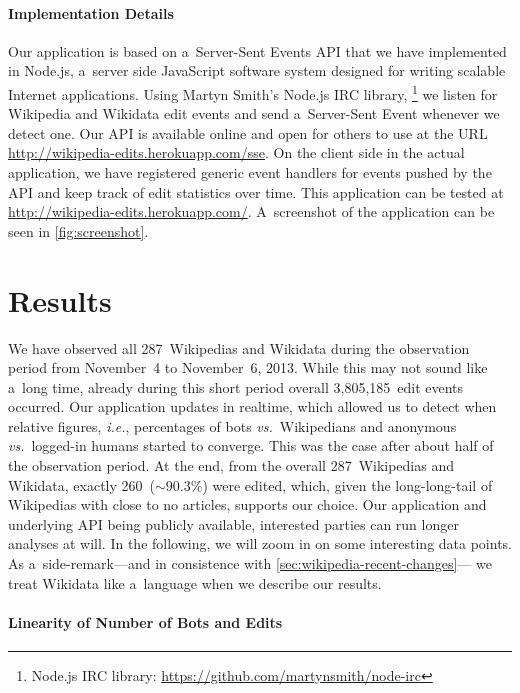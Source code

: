 \documentclass{sig-alternate}
\newcommand{\inlinelistingsize}{\fontsize{8pt}{11pt}}
\let\oldurl\url
\renewcommand{\url}[1]{\inlinelistingsize\oldurl{#1}}
\begin{document}
\paragraph{Implementation Details}

Our application is based on a~Server-Sent Events API
that we have implemented in Node.js,
a~server side JavaScript software system
designed for writing scalable Internet applications.
Using Martyn Smith's Node.js IRC library,%
\footnote{Node.js IRC library:
\url{https://github.com/martynsmith/node-irc}}
we listen for Wikipedia and Wikidata edit events
and send a~Server-Sent Event whenever we detect one.
Our API is available online and open for others to use at the URL
\url{http://wikipedia-edits.herokuapp.com/sse}.
On the client side in the actual application,
we have registered generic event handlers for events
pushed by the API and keep track of edit statistics over time.
This application can be tested at
\url{http://wikipedia-edits.herokuapp.com/}.
A~screenshot of the application
can be seen in \autoref{fig:screenshot}.

\section{Results}

We have observed all 287~Wikipedias and Wikidata
during the observation period from November~4
to November~6, 2013.
While this may not sound like a~long time,
already during this short period
overall 3,805,185~edit events occurred.
Our application updates in realtime,
which allowed us to detect when relative figures,
\emph{i.e.}, percentages of bots \emph{vs.}\ Wikipedians
and anonymous \emph{vs.}\ logged-in humans started to converge.
This was the case after about half of the observation period.
At the end, from the overall 287~Wikipedias and Wikidata,
exactly 260~($\sim90.3\%$) were edited,
which, given the long-long-tail of Wikipedias
with close to no articles, supports our choice.
Our application and underlying API being publicly available,
interested parties can run longer analyses at will.
In the following, we will zoom in on some interesting data points.
As a~side-remark---and in consistence with
\autoref{sec:wikipedia-recent-changes}---%
we treat Wikidata like a~language when we describe our results. 

\paragraph{Linearity of Number of Bots and Edits}
\end{document}
